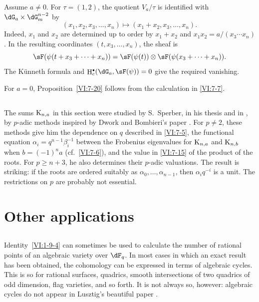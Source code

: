 \documentclass[12pt,oneside,english]{smfbook}
\DeclareMathOperator{\h}{H}
\newcommand{\kloos}{\textnormal{K}} %
\let\oldbullet\bullet
\renewcommand{\bullet}{\textnormal{\tiny$\oldbullet$}}
\begin{document}
Assume $a\ne0$. For $\tau=(1,2)$, the quotient $V_a/\tau$ is identified with $\dG_a\times\dG_m^{n-2}$ by
\[
  (x_1,x_2,x_3,\dots,x_n)
  \longmapsto(x_1+x_2,x_3,\dots,x_n).
\]
Indeed, $x_1$ and $x_2$ are determined up to order by $x_1+x_2$ and $x_1x_2=a/(x_3\cdots x_n)$. In the resulting coordinates $(t,x_3,\dots,x_n)$, the sheaf is
\[
  \sF(\psi(t+x_3+\cdots+x_n))
  =\sF(\psi(t))\otimes\sF(\psi(x_3+\cdots+x_n)).
\]
The Künneth formula and $\h_c^\bullet(\dG_a,\sF(\psi))=0$ give the required vanishing.

For $a=0$, Proposition~\ref{VI:7-20} follows from the calculation in \ref{VI:7-7}.

\subsection{}\label{VI:7-21}

The sums $\kloos_{n,a}$ in this section were studied by S.\ Sperber, in his thesis and in \cite{sp77}, by $p$-adic methods inspired by Dwork and Bombieri's paper \cite{bo66}. For $p\ne2$, these methods give him the dependence on $q$ described in \ref{VI:7-5}, the functional equation $\alpha_i=q^{n-1}\beta_i^{-1}$ between the Frobenius eigenvalues for $\kloos_{n,a}$ and $\kloos_{n,b}$ when $b=(-1)^na$ (cf.\ \ref{VI:7-6}), and the value in \ref{VI:7-15} of the product of the roots. For $p\geqslant n+3$, he also determines their $p$-adic valuations. The result is striking: if the roots are ordered suitably as $\alpha_0,\dots,\alpha_{n-1}$, then $\alpha_iq^{-i}$ is a unit. The restrictions on $p$ are probably not essential.

\section{Other applications}\label{VI:8}

\subsection{}\label{VI:8-1}

Identity~\ref{VI:1-9-4} can sometimes be used to calculate the number of rational points of an algebraic variety over $\dF_q$. In most cases in which an exact result has been obtained, the cohomology can be expressed in terms of algebraic cycles. This is so for rational surfaces, quadrics, smooth intersections of two quadrics of odd dimension, flag varieties, and so forth. It is not always so, however: algebraic cycles do not appear in Lusztig's beautiful paper \cite{lu76}.
\end{document}
